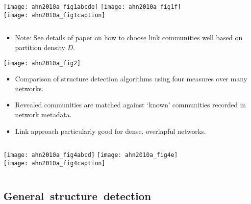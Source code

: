\begin{frame}
  \begin{columns}
    \texttt{[image: ahn2010a\_fig1abcde]}
    \texttt{[image: ahn2010a\_fig1f]}\\
    \texttt{[image: ahn2010a\_fig1caption]}
  \end{columns}

  \begin{block}{}
    \begin{itemize}
    \item 
      Note: See details of paper on how to choose link communities well
      based on partition density $D$.
    \end{itemize}
  \end{block}

\end{frame}

\begin{frame}
  \texttt{[image: ahn2010a\_fig2]}

  \begin{block}{}
    \begin{itemize}
    \item
      Comparison of structure detection algorithms
      using four measures over many networks.
    \item
      Revealed communities are matched against 
      `known' communities recorded in network metadata.
    \item
      Link approach particularly good for dense,
      overlapful networks.
    \end{itemize}
  \end{block}

\end{frame}

\begin{frame}
  \begin{columns}
    \texttt{[image: ahn2010a\_fig4abcd]}
    \texttt{[image: ahn2010a\_fig4e]}\\
    \texttt{[image: ahn2010a\_fig4caption]}
  \end{columns}
\end{frame}

\subsection{General\ structure\ detection}


